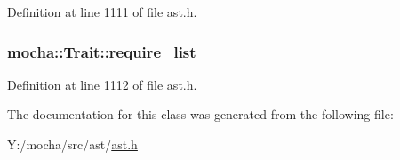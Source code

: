 Definition at line 1111 of file ast.h.

\hypertarget{classmocha_1_1_trait_aa4ffc0c38fc4fb3b9fa094c7ae267154}{
\subsubsection[{require\_\-list\_\-}]{ {\bf mocha::Trait::require\_\-list\_\-}}}
\label{classmocha_1_1_trait_aa4ffc0c38fc4fb3b9fa094c7ae267154}


Definition at line 1112 of file ast.h.



The documentation for this class was generated from the following file:\begin{DoxyCompactItemize}
\item 
Y:/mocha/src/ast/\hyperlink{ast_8h}{ast.h}\end{DoxyCompactItemize}
